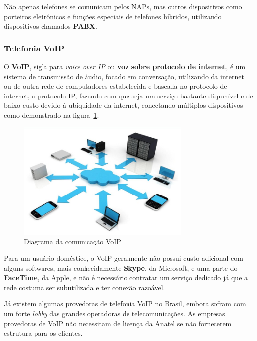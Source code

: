 \documentclass[12pt]{article}
\begin{document}
Não apenas telefones se comunicam pelos NAPs, mas outros dispositivos como
porteiros eletrônicos e funções especiais de telefones híbridos, utilizando
dispositivos chamados \textbf{PABX}.

\subsubsection{Telefonia VoIP}

O \textbf{VoIP}, sigla para \textit{voice over IP} ou
\textbf{voz sobre protocolo de internet}, é um sistema de transmissão de áudio,
focado em conversação, utilizando da internet ou de outra rede de computadores
estabelecida e baseada no protocolo de internet, o protocolo IP, fazendo com
que seja um serviço bastante disponível e de baixo custo devido à ubiquidade da
internet, conectando múltiplos dispositivos como demonstrado na
figura~\ref{fig:voip}.

\vspace*{1em}
\begin{figure}[ht]
    \centering
    \includegraphics[width=0.75\textwidth]{voip.jpg}
    \caption{Diagrama da comunicação VoIP}
    \label{fig:voip}
\end{figure}
\vspace*{1em}

Para um usuário doméstico, o VoIP geralmente não possui custo adicional com
alguns softwares, mais conhecidamente \textbf{Skype}, da Microsoft, e uma parte
do \textbf{FaceTime}, da Apple, e não é necessário contratar um serviço
dedicado já que a rede costuma ser subutilizada e ter conexão razoável.

Já existem algumas provedoras de telefonia VoIP no Brasil, embora sofram com um
forte \textit{lobby} das grandes operadoras de telecomunicações. As empresas
provedoras de VoIP não necessitam de licença da Anatel se não fornecerem
estrutura para os clientes.
\end{document}
